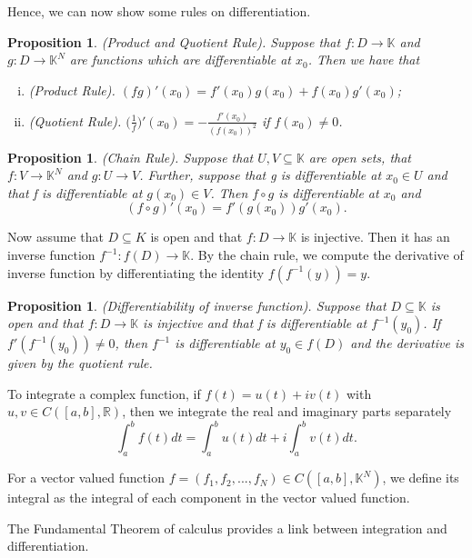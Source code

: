 \documentclass[twoside]{article}
\newtheorem{proposition}[theorem]{Proposition}
\begin{document}
Hence, we can now show some rules on differentiation.
\begin{proposition}(Product and Quotient Rule). Suppose that $f: D \rightarrow \mathbb{K}$ and $g: D \rightarrow \mathbb{K}^N$ are functions which are differentiable at $x_0$. Then we have that 
\begin{enumerate}[(i)]
    \item (Product Rule). $(fg)'(x_0) = f'(x_0)g(x_0) + f(x_0)g'(x_0)$;
    \item (Quotient Rule). $\big(\frac{1}{f}\big)'(x_0) = -\frac{f'(x_0)}{(f(x_0))^2}$ if $f(x_0) \neq 0$.
\end{enumerate}
\end{proposition}

\begin{proposition}(Chain Rule). Suppose that $U, V \subseteq \mathbb{K}$ are open sets, that $f: V \rightarrow \mathbb{K}^N$ and $g: U \rightarrow V$. Further, suppose that g is differentiable at $x_0 \in U$ and that f is differentiable at $g(x_0) \in V$. Then $f \circ g$ is differentiable at $x_0$ and 
$$
(f \circ g)'(x_0) = f'(g(x_0))g'(x_0).
$$
\end{proposition}

Now assume that $D \subseteq K$ is open and that $f: D \rightarrow \mathbb{K}$ is injective. Then it has an inverse function $f^{-1}: f(D) \rightarrow \mathbb{K}$. By the chain rule, we compute the derivative of inverse function by differentiating the identity $f(f^{-1}(y)) = y$.

\begin{proposition}(Differentiability of inverse function). Suppose that $D \subseteq \mathbb{K}$ is open and that $f: D \rightarrow \mathbb{K}$ is injective and that f is differentiable at $f^{-1}(y_0)$. If $f'(f^{-1}(y_0)) \neq 0$, then $f^{-1}$ is differentiable at $y_0 \in f(D)$ and the derivative is given by the quotient rule.
\end{proposition}

To integrate a complex function, if $f(t) = u(t) + iv(t)$ with $u, v \in C([a,b], \mathbb{R})$, then we integrate the real and imaginary parts separately
$$
\int_a^bf(t)dt = \int_a^bu(t)dt + i\int_a^bv(t)dt.
$$

For a vector valued function $f = (f_1, f_2, ..., f_N) \in C([a,b],\mathbb{K}^N)$, we define its integral as the integral of each component in the vector valued function.

The Fundamental Theorem of calculus provides a link between integration and differentiation.
\end{document}
